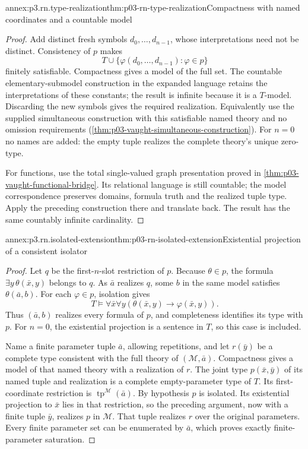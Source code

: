 \begin{annexitem}{annex:p3.rn.type-realization}{thm:p03-rn-type-realization}{Compactness with named coordinates and a countable model}
\begin{proof}
Add distinct fresh symbols \(d_0,\ldots,d_{n-1}\), whose
interpretations need not be distinct.
Consistency of \(p\) makes
\[
 T\cup\{\varphi(d_0,\ldots,d_{n-1}):\varphi\in p\}
\]
finitely satisfiable. Compactness gives a model of the full
set. The countable elementary-submodel construction in
the expanded language retains the interpretations of these
constants; the result is infinite because it is a \(T\)-model.
Discarding the new symbols gives the required realization.
Equivalently use the supplied simultaneous construction
with this satisfiable named theory and no omission
requirements (\cref{thm:p03-vaught-simultaneous-construction}).
For \(n=0\) no names are added: the empty tuple realizes
the complete theory's unique zero-type.

For functions, use the total single-valued graph presentation
proved in \cref{thm:p03-vaught-functional-bridge}.
Its relational language is still countable; the model
correspondence preserves domains, formula truth and
the realized tuple type. Apply the preceding construction
there and translate back. The result has the same
countably infinite cardinality.
\end{proof}
\end{annexitem}

\begin{annexitem}{annex:p3.rn.isolated-extension}{thm:p03-rn-isolated-extension}{Existential projection of a consistent isolator}
\begin{proof}
Let \(q\) be the first-\(n\)-slot restriction of \(p\).
Because \(\theta\in p\), the formula
\(\exists y\,\theta(\bar x,y)\) belongs to \(q\).
As \(\bar a\) realizes \(q\), some \(b\) in the same model
satisfies \(\theta(\bar a,b)\).
For each \(\varphi\in p\), isolation gives
\[
 T\models\forall\bar x\forall y
               (\theta(\bar x,y)\to\varphi(\bar x,y)).
\]
Thus \((\bar a,b)\) realizes every formula of \(p\),
and completeness identifies its type with \(p\).
For \(n=0\), the existential projection is a sentence in \(T\),
so this case is included.

Name a finite parameter tuple \(\bar a\), allowing repetitions,
and let \(r(\bar y)\) be a complete type consistent with
the full theory of \((\mathcal M,\bar a)\).
Compactness gives a model of that named theory with a
realization of \(r\).
The joint type \(p(\bar x,\bar y)\) of its named tuple
and realization is a complete empty-parameter type of \(T\).
Its first-coordinate restriction is
\(\operatorname{tp}^{\mathcal M}(\bar a)\).
By hypothesis \(p\) is isolated.
Its existential projection to \(\bar x\) lies in that
restriction, so the preceding argument, now with a finite
tuple \(\bar y\), realizes \(p\) in \(\mathcal M\).
That tuple realizes \(r\) over the original parameters.
Every finite parameter set can be enumerated by \(\bar a\),
which proves exactly finite-parameter saturation.
\end{proof}
\end{annexitem}

